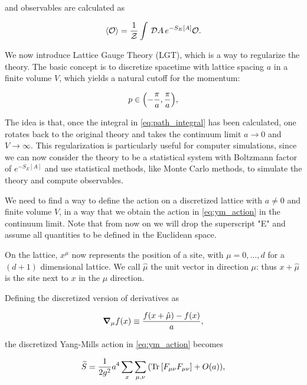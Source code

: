 \documentclass[reqno,12pt]{article}
\numberwithin{equation}{section}
\newcommand{\D}[1]{\,\mathcal{D}#1\,}
\newcommand{\Z}{\mathcal{Z}}
\begin{document}
and observables are calculated as

\begin{equation} \label{eq:obs_expval}
	\expval{\mathcal{O}} = \frac{1}{\Z} \int \D{A} e^{-S_E[A]} \mathcal{O}.
\end{equation}

We now introduce Lattice Gauge Theory (LGT), which is a way to regularize the theory. The basic concept
is to discretize spacetime with lattice spacing $a$ in a finite volume $V$, which yields a natural cutoff for the momentum:

\begin{equation}
	p \in \qty(-\frac{\pi}{a}, \frac{\pi}{a}),
\end{equation}

The idea is that, once the integral in \eqref{eq:path_integral} has been calculated, one rotates back to the original
theory and takes the continuum limit $a \rightarrow 0$ and $V \rightarrow \infty$. This regularization is particularly useful
for computer simulations, since we can now consider the theory to be a statistical system with Boltzmann factor of $e^{-S_E[A]}$
and use statistical methods, like Monte Carlo methods, to simulate the theory and compute observables. 

We need to find a way to define the action on a discretized lattice with $a \ne 0$ and finite volume $V$, 
in a way that we obtain the action in \eqref{eq:ym_action} in the continuum limit. Note that from now on we will drop the
superscript "E" and assume all quantities to be defined in the Euclidean space. 

On the lattice, $x^\mu$ now represents the position of a site, with $\mu = 0, \dots, d$ for a $(d+1)$ dimensional lattice.
We call $\hat{\mu}$ the unit vector in direction $\mu$: thus $x + \hat{\mu}$ is the site next to $x$ in the $\mu$ direction.  

Defining the discretized version of derivatives as

\begin{equation} \label{eq:discrete_derivative}
	\grad_\mu f(x) \equiv \frac{f(x + \hat\mu) - f(x)}{a},
\end{equation}

the discretized Yang-Mills action in \eqref{eq:ym_action} becomes

\begin{equation} \label{eq:discrete_ym_action}
	\widetilde{S} = \frac{1}{2g^2} a^4 \sum_x \sum_{\mu,\nu} \qty(\Tr\qty[F_{\mu\nu}F_{\mu\nu}] + O(a)),
\end{equation}
\end{document}
